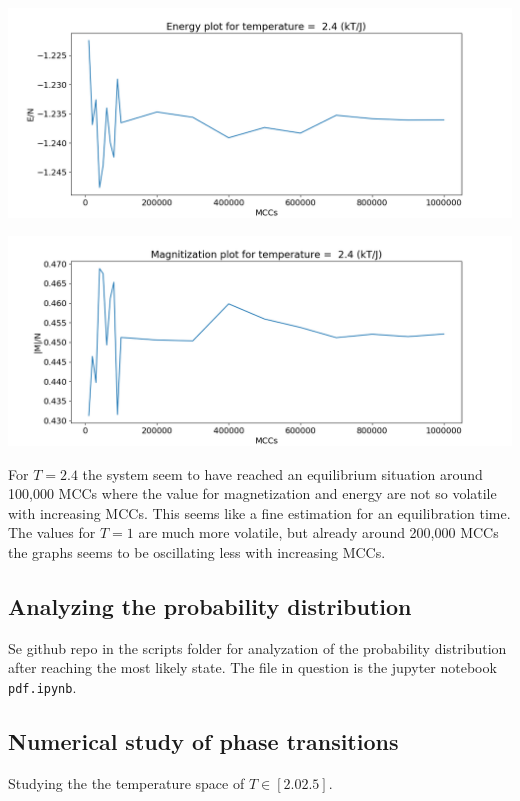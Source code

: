\documentclass[a4paper, fontsize=11pt]{article}
\begin{document}
\begin{center}
\includegraphics[scale=0.45]{ET24.png} 
\end{center}

\begin{center}
\includegraphics[scale=0.45]{MT24.png} 
\end{center}

For $T = 2.4$ the system seem to have reached an equilibrium situation around 100,000 MCCs where the value for magnetization and energy are not so volatile with increasing MCCs. This seems like a fine estimation for an equilibration time. The values for $T = 1$ are much more volatile, but already around 200,000 MCCs the graphs seems to be oscillating less with increasing MCCs.

\subsection{Analyzing the probability distribution}
Se github repo in the scripts folder for analyzation of the probability distribution after reaching the most likely state. The file in question is the jupyter notebook \verb+pdf.ipynb+.

\subsection{Numerical study of phase transitions}
Studying the the temperature space of $T \in [2.0 2.5]$.
\end{document}
